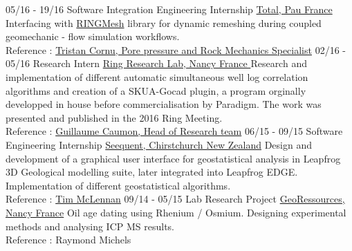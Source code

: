 \documentclass[]{friggeri-cv}
\begin{document}
\begin{entrylist}
{	}
  \entry
    {05/16 - 19/16}
    {Software Integration Engineering Internship}
    {\href{https://www.total.com/en}{Total, Pau France}}
    {Interfacing with \href{http://www.ring-team.org/software/ringmesh}{RINGMesh} library for dynamic remeshing during coupled geomechanic - flow simulation workflows.\\ Reference : \href{mailto:tristan.cornu@total.com}{Tristan Cornu, Pore pressure and Rock Mechanics Specialist}}
    \entry
    {02/16 - 05/16}
    {Research Intern}
    {\href{http://www.ring-team.org/}{Ring Research Lab, Nancy France }}
    {Research and implementation of different automatic simultaneous well log correlation algorithms and creation of a SKUA-Gocad plugin, a program orginally developped in house before commercialisation by Paradigm. The work was presented and published in the 2016 Ring Meeting. \\Reference : \href{mailto:Guillaume.Caumon@ensg.univ-lorraine.fr}{Guillaume Caumon, Head of Research team}}
    \entry
    {06/15 - 09/15}
    {Software Engineering Internship}
    {\href{https://www.seequent.com/}{Seequent, Chirstchurch New Zealand}}
    {Design and development of a graphical user interface for geostatistical analysis in Leapfrog 3D Geological modelling suite, later integrated into Leapfrog EDGE. Implementation of different geostatistical algorithms.
    \\
    Reference : \href{mailto:tim.mclennan@seequent.com}{Tim McLennan}}
	\entry
	{09/14 - 05/15}
	{Lab Research Project}
	{\href{http://georessources.univ-lorraine.fr/}{GeoRessources, Nancy France}}
	{Oil age dating using Rhenium / Osmium. Designing experimental methods and analysing ICP MS results. 
	\\
	Reference : Raymond Michels}
\end{entrylist}
\\
\newpage
\end{document}
